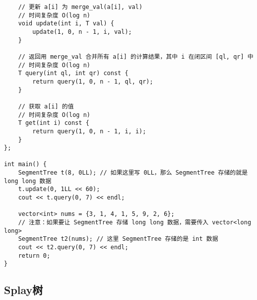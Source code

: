\documentclass[12pt,a4paper,UTF16]{ctexbook}
\theoremstyle{plain}
\begin{document}
\begin{lstlisting}
    // 更新 a[i] 为 merge_val(a[i], val)
    // 时间复杂度 O(log n)
    void update(int i, T val) {
        update(1, 0, n - 1, i, val);
    }

    // 返回用 merge_val 合并所有 a[i] 的计算结果，其中 i 在闭区间 [ql, qr] 中
    // 时间复杂度 O(log n)
    T query(int ql, int qr) const {
        return query(1, 0, n - 1, ql, qr);
    }

    // 获取 a[i] 的值
    // 时间复杂度 O(log n)
    T get(int i) const {
        return query(1, 0, n - 1, i, i);
    }
};

int main() {
    SegmentTree t(8, 0LL); // 如果这里写 0LL，那么 SegmentTree 存储的就是 long long 数据
    t.update(0, 1LL << 60);
    cout << t.query(0, 7) << endl;

    vector<int> nums = {3, 1, 4, 1, 5, 9, 2, 6};
    // 注意：如果要让 SegmentTree 存储 long long 数据，需要传入 vector<long long>
    SegmentTree t2(nums); // 这里 SegmentTree 存储的是 int 数据
    cout << t2.query(0, 7) << endl;
    return 0;
}
\end{lstlisting}

\subsection{Splay树}
\end{document}
